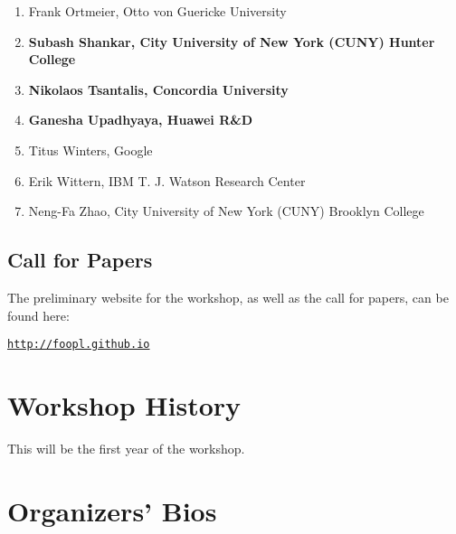 \documentclass[10pt, conference]{IEEEtran}
\begin{document}
\begin{enumerate}
	\item Frank Ortmeier, Otto von Guericke University

	\item \textbf{Subash Shankar, City University of New York (CUNY) Hunter College}

	\item \textbf{Nikolaos Tsantalis, Concordia University}

	\item \textbf{Ganesha Upadhyaya, Huawei R\&D}

	\item Titus Winters, Google

	\item Erik Wittern, IBM T. J. Watson Research Center

	\item Neng-Fa Zhao, City University of New York (CUNY) Brooklyn College

\end{enumerate}

\subsection{Call for Papers}

The preliminary website for the workshop, as well as the call for papers, can be found here:

\begin{center}
  \texttt{\url{http://foopl.github.io}}
\end{center}

\section{Workshop History}

This will be the first year of the workshop.

\section{Organizers' Bios}
\end{document}
